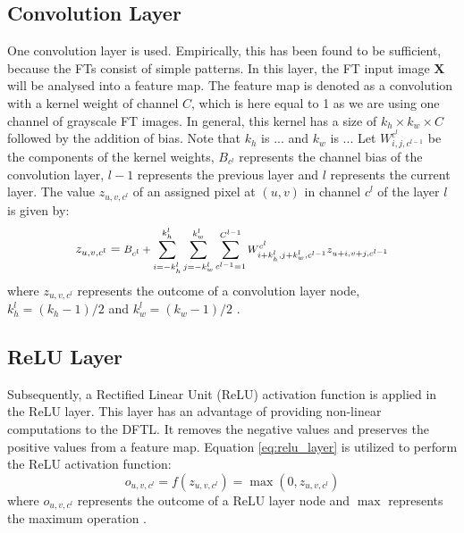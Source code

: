 \documentclass[conference]{IEEEtran}
\begin{document}
\subsection{Convolution Layer}
One convolution layer is used. Empirically, this has been found to be sufficient, because the FTs consist of simple patterns. In this layer, the FT input image $\textbf{X}$ will be analysed into a feature map. The feature map is denoted as a convolution with a kernel weight of channel $C$, which is here equal to 1 as we are using one channel of grayscale FT images.  In general, this kernel has a size of $k_h \times k_w \times C$ followed by the addition of bias. Note that $k_h$ is ... and $k_w$ is ... Let $W_{i,j,c^{l-1}}^{c^{l}}$ be the components of the kernel weights, $B_{c^{l}}$ represents the channel bias of the convolution layer, $l-1$ represents the previous layer and $l$ represents the current layer. The value $z_{u,v,c^{l}}$ of an assigned pixel at $(u,v)$ in channel $c^{l}$ of the layer $l$ is given by:
\begin{equation}
z_{u,v,c^{l}}= \text{\footnotesize $B_{c^{l}}+\sum_{i=-k_h^{l}}^{k_h^{l}}\sum_{j=-k_w^{l}}^{k_w^{l}}\sum_{c^{l-1}=1}^{C^{l-1}} W_{i+k_h^{l},j+k_w^{l},c^{l-1}}^{c^{l}} z_{u+i,v+j,c^{l-1}}$}
\label{eq:conv_layer}
\end{equation}
where $z_{u,v,c^{l}}$ represents the outcome of a convolution layer node, $k_h^{l}=(k_h-1)/2$ and $k_w^{l}=(k_w-1)/2$ \cite{simo2016learning}. 

\subsection{ReLU Layer}
Subsequently, a Rectified Linear Unit (ReLU) activation function is applied in the ReLU layer. This layer has an advantage of providing non-linear computations to the DFTL. It removes the negative values and preserves the positive values from a feature map. Equation \eqref{eq:relu_layer} is utilized to perform the ReLU activation function:
\begin{equation}
o_{u,v,c^{l}}=f(z_{u,v,c^{l}})=\max(0,z_{u,v,c^{l}})
\label{eq:relu_layer}
\end{equation}
where $o_{u,v,c^{l}}$ represents the outcome of a ReLU layer node and $\max$ represents the maximum operation \cite{krizhevsky2012imagenet}. 
\end{document}
